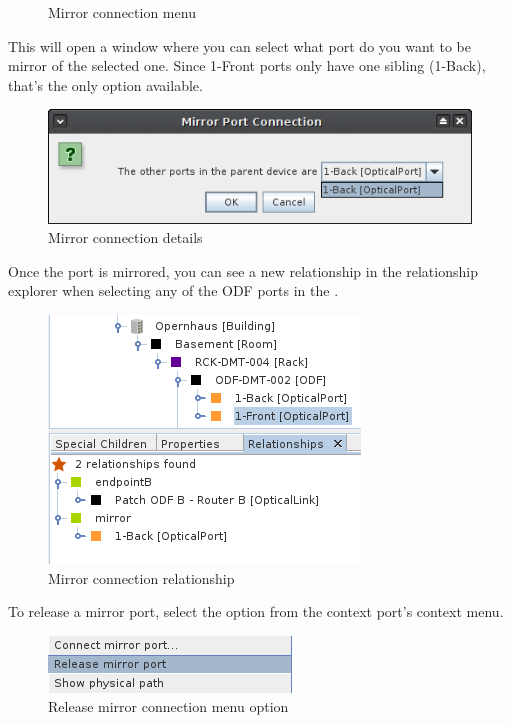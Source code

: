 \documentclass[a4paper]{article}
\begin{document}
\begin{enumerate}
\begin{figure}[h!]
						\caption{Mirror connection menu}
						\label{fig:l1_example_2_mirror_connection_menu}
					\end{figure}
					\newpage
					This will open a window where you can select what port do you want to be mirror of the selected one. Since 1-Front ports only have one sibling (1-Back), that's the only option available.
					\begin{figure}[h!]
						\centering
						\includegraphics[width=0.5\linewidth]{img/l1_example_2_mirror_connection_details.png}
						\caption{Mirror connection details}
						\label{fig:l1_example_2_mirror_connection_details}
					\end{figure}
					
					Once the port is mirrored, you can see a new relationship in the relationship explorer when selecting any of the ODF ports in the \textbf{}.
					\begin{figure}[h!]
						\centering
						\includegraphics[width=0.4\linewidth]{img/l1_example_2_mirror_connection_relationships.png}
						\caption{Mirror connection relationship}
						\label{fig:l1_example_2_mirror_connection_relationships}
					\end{figure}
					
					To release a mirror port, select the option from the context port's context menu.
					\begin{figure}[h!]
						\centering
						\includegraphics[width=0.3\linewidth]{img/l1_example_2_mirror_connection_release.png}
						\caption{Release mirror connection menu option}
						\label{fig:l1_example_2_mirror_connection_release}
					\end{figure}
			\end{enumerate}
			
\end{document}
